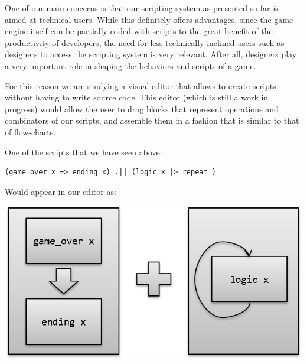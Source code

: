 
One of our main concerns is that our scripting system as presented so far is aimed at technical users. While this definitely offers advantages, since the game engine itself can be partially coded with scripts to the great benefit of the productivity of developers, the need for less technically inclined users such as designers to access the scripting system is very relevant. After all, designers play a very important role in shaping the behaviors and scripts of a game.

For this reason we are studying a visual editor that allows to create scripts without having to write source code. This editor (which is still a work in progress) would allow the user to drag blocks that represent operations and combinators of our scripts, and assemble them in a fashion that is similar to that of flow-charts.

One of the scripts that we have seen above:

\begin{lstlisting}
(game_over x => ending x) .|| (logic x |> repeat_)
\end{lstlisting}

Would appear in our editor as:

\begin{center}
\includegraphics[scale=0.5]{visual_script.png}
\label{Visual script}
\end{center}
